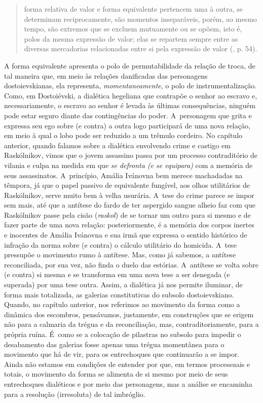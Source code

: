 \begin{quote}
forma relativa de valor e forma equivalente pertencem uma à outra, se
determinam reciprocamente, são momentos inseparáveis, porém, ao mesmo
tempo, são extremos que se excluem mutuamente ou se opõem, isto é, polos
da mesma expressão de valor; elas se repartem sempre entre as diversas
mercadorias relacionadas entre si pela expressão de valor (, p. 54).
\end{quote}

A forma equivalente apresenta o polo de permutabilidade da relação de
troca, de tal maneira que, em meio às relações danificadas das
personagens dostoievskianas, ela representa, \emph{momentaneamente}, o
polo de instrumentalização. Como, em Dostoiévski, a dialética hegeliana
que contrapõe o senhor ao escravo e, necessariamente, o escravo ao
senhor é levada às últimas consequências, ninguém pode estar seguro
diante das contingências do poder. A~personagem que grita e expressa seu
ego sobre (e contra) a outra logo participará de uma nova relação, em
meio à qual o lobo pode ser reduzido a um trêmulo cordeiro. No capítulo
anterior, quando falamos sobre a dialética envolvendo crime e castigo em
Raskólnikov, vimos que o jovem assassino passa por um processo
contraditório de vilania e culpa na medida em que \emph{se defronta (e
se equipara)} com a memória de seus assassinatos. A~princípio, Amália
Ivánovna bem merece machadadas na têmpora, já que o papel passivo de
equivalente fungível, aos olhos utilitários de Raskólnikov, serve muito
bem à velha usurária. A~tese do crime parece se impor sem mais, até que
a antítese do fardo de ter aspergido sangue alheio faz com que
Raskólnikov passe pela cisão (\emph{raskol}) de se tornar um outro para
si mesmo e de fazer parte de uma nova relação: posteriormente, é a
memória dos corpos inertes e inocentes de Amália Ivánovna e sua irmã que
expressa o sentido histórico de infração da norma sobre (e contra) o
cálculo utilitário do homicida. A~tese pressupõe o movimento rumo à
antítese. Mas, como já sabemos, a antítese reconciliada, por sua vez,
não finda o duelo das estórias. A~antítese se volta sobre (e contra) si
mesma e se transforma em uma nova tese a ser denegada (e superada) por
uma tese outra. Assim, a dialética já nos permite iluminar, de forma
mais totalizada, as galerias constitutivas do subsolo dostoievskiano.
Quando, no capítulo anterior, nos referimos ao movimento da forma como a
dinâmica dos escombros, pensávamos, justamente, em construções que se
erigem não para a calmaria da trégua e da reconciliação, mas,
contraditoriamente, para a própria ruína. É~como se a colocação de
pilastras no subsolo para impedir o desabamento das galerias fosse
apenas uma trégua momentânea para o movimento que há de vir, para os
entrechoques que continuarão a se impor. Ainda não estamos em condições
de entender por que, em termos processuais e totais, o movimento da
forma se alimenta de si mesmo por meio de seus entrechoques dialéticos e
por meio das personagens, mas a análise se encaminha para a resolução
(irresoluta) de tal imbróglio.

